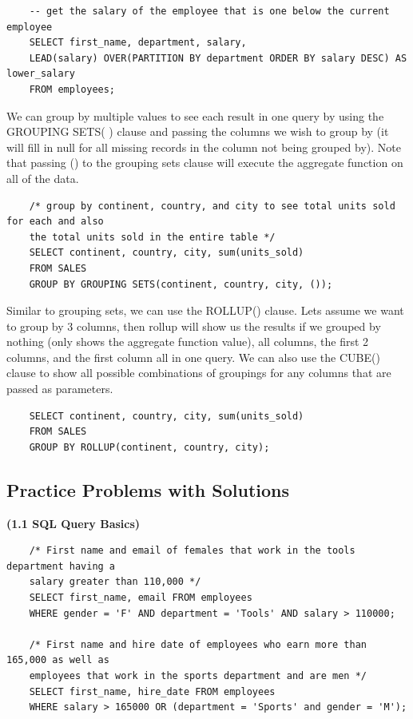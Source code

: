 \documentclass[11pt, a4paper]{article}
\begin{document}
\begin{spacing}{1.1}
	\begin{lstlisting}
	-- get the salary of the employee that is one below the current employee
	SELECT first_name, department, salary, 
	LEAD(salary) OVER(PARTITION BY department ORDER BY salary DESC) AS lower_salary
	FROM employees;	\end{lstlisting} \vspace*{1mm}
	We can group by multiple values to see each result in one query by using the GROUPING SETS( ) clause and passing the columns we wish to group by (it will fill in null for all missing records in the column not being grouped by). Note that passing () to the grouping sets clause will execute the aggregate function on all of the data. \newpage
	\begin{lstlisting}
	/* group by continent, country, and city to see total units sold for each and also
	the total units sold in the entire table */
	SELECT continent, country, city, sum(units_sold)
	FROM SALES
	GROUP BY GROUPING SETS(continent, country, city, ()); \end{lstlisting} \vspace*{1mm}
	Similar to grouping sets, we can use the ROLLUP() clause. Lets assume we want to group by 3 columns, then rollup will show us the results if we grouped by nothing (only shows the aggregate function value), all columns, the first 2 columns, and the first column all in one query. We can also use the CUBE() clause to show all possible combinations of groupings for any columns that are passed as parameters.
	\begin{lstlisting}
	SELECT continent, country, city, sum(units_sold)
	FROM SALES
	GROUP BY ROLLUP(continent, country, city); \end{lstlisting} \vspace*{5mm}
	
	\subsection{Practice Problems with Solutions}
	\large \textbf{(1.1 SQL Query Basics)} \normalsize
	\begin{lstlisting}
	/* First name and email of females that work in the tools department having a 
	salary greater than 110,000 */
	SELECT first_name, email FROM employees
	WHERE gender = 'F' AND department = 'Tools' AND salary > 110000;
	
	/* First name and hire date of employees who earn more than 165,000 as well as 
	employees that work in the sports department and are men */
	SELECT first_name, hire_date FROM employees
	WHERE salary > 165000 OR (department = 'Sports' and gender = 'M');
	

\end{lstlisting}
\end{spacing}
\end{document}
